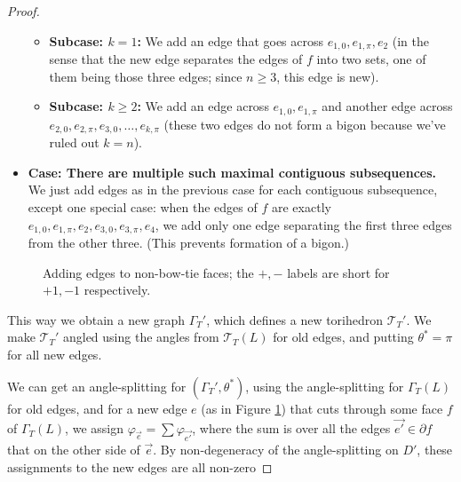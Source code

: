 \documentclass[11pt]{amsart}
\newcommand{\figref}[1]{Figure \ref{#1}}
\newcommand{\sT}{{\mathcal{T}}}
\newcommand{\del}{\partial}
\newcommand{\vphi}{\varphi}
\theoremstyle{plain}
\theoremstyle{definition}
\begin{document}
\begin{proof}
\begin{itemize}
\begin{itemize}
\item \textbf{Subcase: $k=1$:}
We add an edge that goes across $e_{1,0},e_{1,\pi},e_2$
(in the sense that the new edge separates the edges of $f$ into two sets,
one of them being those three edges;
since $n\geq 3$, this edge is new).

\item \textbf{Subcase: $k \geq 2$:}
We add an edge across $e_{1,0},e_{1,\pi}$
and another edge across $e_{2,0},e_{2,\pi},e_{3,0},\ldots,e_{k,\pi}$
(these two edges do not form a bigon because we've ruled out $k=n$).
\end{itemize}

\item \textbf{Case: There are multiple such maximal contiguous subsequences.}
We just add edges as in the previous case for each contiguous subsequence,
except one special case: when the edges of $f$ are exactly
$e_{1,0},e_{1,\pi},e_2,e_{3,0},e_{3,\pi},e_4$,
we add only one edge separating the first three edges from the other three.
(This prevents formation of a bigon.)
\end{itemize}


\begin{figure}

\caption{Adding edges to non-bow-tie faces;
the $+,-$ labels are short for $+1,-1$ respectively.}
\label{f:adding_edges}
\end{figure}


This way we obtain a new graph $\Gamma_T'$, which defines a
new torihedron $\sT_T'$.
We make $\sT_T'$ angled using the angles from $\sT_T(L)$ for old edges,
and putting $\theta^* = \pi$ for all new edges.


We can get an angle-splitting for $(\Gamma_T',\theta^*)$,
using the angle-splitting for $\Gamma_T(L)$ for old edges,
and for a new edge $e$ (as in \figref{f:adding_edges})
that cuts through some face $f$ of $\Gamma_T(L)$,
we assign $\vphi_{\vec{e}} = \sum \vphi_{\vec{e'}}$,
where the sum is over all the edges $\vec{e'} \in \del f$
that on the other side of $\vec{e}$.
By non-degeneracy of the angle-splitting on $D'$,
these assignments to the new edges are all non-zero



\end{proof}
\end{document}
